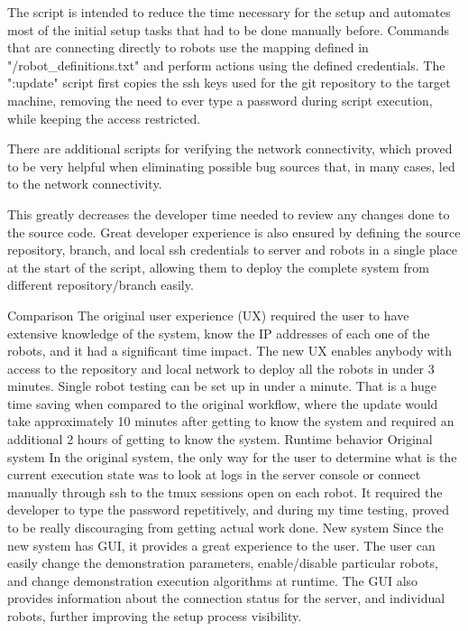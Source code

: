The script is intended to reduce the time necessary for the setup and automates most of the initial setup tasks that had to be done manually before.
Commands that are connecting directly to robots use the mapping defined in "/robot_definitions.txt" and perform actions using the defined credentials.
The ":update" script first copies the ssh keys used for the git repository to the target machine, removing the need to ever type a password during script execution, while keeping the access restricted.

There are additional scripts for verifying the network connectivity, which proved to be very helpful when eliminating possible bug sources that, in many cases, led to the network connectivity.

This greatly decreases the developer time needed to review any changes done to the source code. Great developer experience is also ensured by defining the source repository, branch, and local ssh credentials to server and robots in a single place at the start of the script, allowing them to deploy the complete system from different repository/branch easily.

\secc Comparison
The original user experience (UX) required the user to have extensive knowledge of the system, know the IP addresses of each one of the robots, and it had a significant time impact. The new UX enables anybody with access to the repository and local network to deploy all the robots in under 3 minutes. Single robot testing can be set up in under a minute. That is a huge time saving when compared to the original workflow, where the update would take approximately 10 minutes after getting to know the system and required an additional 2 hours of getting to know the system.
\sec Runtime behavior
\secc Original system
In the original system, the only way for the user to determine what is the current execution state was to look at logs in the server console or connect manually through ssh to the tmux sessions open on each robot. It required the developer to type the password repetitively, and during my time testing, proved to be really discouraging from getting actual work done.
\secc New system
Since the new system has GUI, it provides a great experience to the user. The user can easily change the demonstration parameters, enable/disable particular robots, and change demonstration execution algorithms at runtime. The GUI also provides information about the connection status for the server, and individual robots, further improving the setup process visibility.

